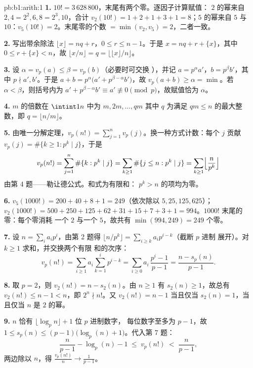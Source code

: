 \begin{solution}{pb:b1:arith:1}
\textbf{1.} $10! = 3\,628\,800$，末尾有两个零。逐因子计算赋值：
$2$ 的幂来自 $2, 4 = 2^2, 6, 8 = 2^3,
10$，合计 $v_2(10!) = 1 + 2 + 1 + 3 + 1 = 8$；$5$ 的幂来自
$5$ 与 $10$：$v_5(10!) = 2$。末尾零的个数 $=
\min(v_2, v_5) = 2$，二者一致。

\textbf{2.} 写出带余除法 $\lfloor x\rfloor = nq +
r$，$0 \leq r \leq n - 1$。于是 $x = nq + r + \{x\}$，其中 $0 \leq
r + \{x\} < n$，故 $\lfloor x/n \rfloor = q = \bigl\lfloor \lfloor
x \rfloor / n \bigr\rfloor$。

\textbf{3.} 设 $\alpha = v_p(a) \leq \beta = v_p(b)$（必要时可交换
），并记 $a = p^\alpha a'$，$b = p^\beta b'$，其中 $p
\nmid a', b'$。于是 $a + b = p^\alpha\bigl(a' + p^{\beta -
\alpha}b'\bigr)$，故 $v_p(a + b) \geq \alpha = \min$。若 $\alpha <
\beta$，则括号内为 $a' + p^{\beta-\alpha}b' \equiv a'
\not\equiv 0 \pmod p$，故赋值恰为 $\alpha$。

\textbf{4.} $m$ 的倍数在 $\intint1n$ 中为 $m, 2m, \dots,
qm$ 其中 $q$ 为满足 $qm \leq n$ 的最大整数，即 $q =
\lfloor n/m \rfloor$。

\textbf{5.} 由唯一分解定理，$v_p(n!) = \sum_{j=1}^{n}
v_p(j)$。换一种方式计数：每个 $j$ 贡献 $v_p(j) =
\#\{k \geq 1 : p^k \mid j\}$，于是
\[
v_p(n!) = \sum_{j=1}^n \#\{k : p^k \mid j\}
= \sum_{k\geq1} \#\{j \leq n : p^k \mid j\}
= \sum_{k\geq1} \Bigl\lfloor \frac n{p^k} \Bigr\rfloor
\]
由第 4 题——勒让德公式。和式为有限和：
$p^k > n$ 的项均为零。

\textbf{6.} $v_5(1000!) = 200 + 40 + 8 + 1 = 249$（依次除以
$5, 25, 125, 625$）；$v_2(1000!) = 500 + 250 + 125 + 62 + 31 + 15 +
7 + 3 + 1 = 994$。$1000!$ 末尾的零：每个零消耗
一个 $2$ 与一个 $5$，故共有 $\min(994, 249) = 249$ 个零。

\textbf{7.} 设 $n = \sum_i a_ip^i$，由第 2 题得 $\lfloor
n/p^k \rfloor = \sum_{i \geq k} a_ip^{i-k}$（截断 $p$ 进制
展开）。对 $k \geq 1$ 求和，并交换两个有限
和的次序：
\[
v_p(n!) = \sum_{i\geq1} a_i \sum_{k=1}^{i} p^{i-k}
= \sum_{i\geq0} a_i\,\frac{p^i - 1}{p - 1}
= \frac{n - s_p(n)}{p - 1} .
\]

\textbf{8.} 取 $p = 2$，则 $v_2(n!) = n - s_2(n)$。由 $n \geq 1$
有 $s_2(n) \geq 1$，故总有 $v_2(n!) \leq n - 1 < n$，即 $2^n \nmid
n!$。又 $v_2(n!) = n - 1$ 当且仅当 $s_2(n) = 1$，当且仅当 $n$ 是
$2$ 的幂。

\textbf{9.} $n$ 恰有 $\lfloor \log_p n \rfloor + 1$ 位 $p$ 进制数字，
每位数字至多为 $p - 1$，故 $1 \leq s_p(n) \leq
(p-1)\bigl(\log_p(n) + 1\bigr)$。代入第 7 题：
\[
\frac n{p-1} - \log_p(n) - 1 \;\leq\; v_p(n!) \;<\; \frac n{p-1},
\]
两边除以 $n$，得 $\frac{v_p(n!)}n \to \frac1{p-1}$。


\end{solution}

